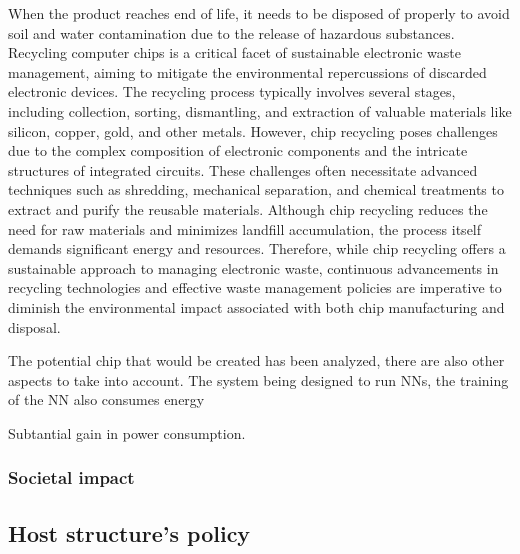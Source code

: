 When the product reaches end of life, it needs to be disposed of properly to avoid soil and water contamination due to the release of hazardous substances. Recycling computer chips is a critical facet of sustainable electronic waste management, aiming to mitigate the environmental repercussions of discarded electronic devices. The recycling process typically involves several stages, including collection, sorting, dismantling, and extraction of valuable materials like silicon, copper, gold, and other metals. However, chip recycling poses challenges due to the complex composition of electronic components and the intricate structures of integrated circuits. These challenges often necessitate advanced techniques such as shredding, mechanical separation, and chemical treatments to extract and purify the reusable materials. Although chip recycling reduces the need for raw materials and minimizes landfill accumulation, the process itself demands significant energy and resources. Therefore, while chip recycling offers a sustainable approach to managing electronic waste, continuous advancements in recycling technologies and effective waste management policies are imperative to diminish the environmental impact associated with both chip manufacturing and disposal.

The potential chip that would be created has been analyzed, there are also other aspects to take into account. The system being designed to run \acp{NN}, the training of the \ac{NN} also consumes energy

Subtantial gain in power consumption.

\subsubsection{Societal impact}

\subsection{Host structure's policy}
